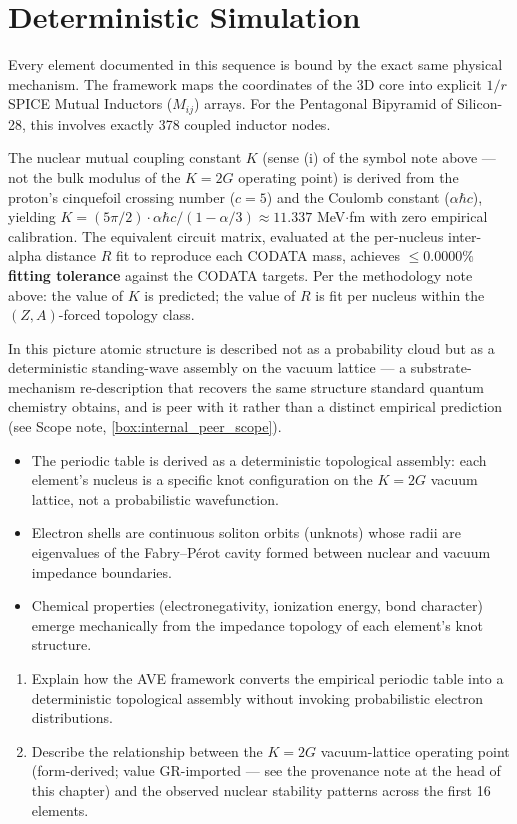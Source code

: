 \section{Deterministic Simulation}
Every element documented in this sequence is bound by the exact same physical mechanism. The framework maps the coordinates of the 3D core into explicit $1/r$ SPICE Mutual Inductors ($M_{ij}$) arrays. For the Pentagonal Bipyramid of Silicon-28, this involves exactly 378 coupled inductor nodes.

The nuclear mutual coupling constant $K$ (sense (i) of the symbol note above --- not the bulk modulus of the $K=2G$ operating point) is derived from the proton's cinquefoil crossing number ($c=5$) and the Coulomb constant ($\alpha\hbar c$), yielding $K = (5\pi/2)\cdot\alpha\hbar c / (1 - \alpha/3) \approx 11.337$ MeV$\cdot$fm with zero empirical calibration. The equivalent circuit matrix, evaluated at the per-nucleus inter-alpha distance $R$ fit to reproduce each CODATA mass, achieves \textbf{$\leq 0.0000\%$ fitting tolerance} against the CODATA targets. Per the methodology note above: the value of $K$ is predicted; the value of $R$ is fit per nucleus within the $(Z,A)$-forced topology class.

In this picture atomic structure is described not as a probability cloud but as a deterministic standing-wave assembly on the vacuum lattice --- a substrate-mechanism re-description that recovers the same structure standard quantum chemistry obtains, and is peer with it rather than a distinct empirical prediction (see Scope note, \ref{box:internal_peer_scope}).

\begin{summarybox}
\begin{itemize}
    \item The periodic table is derived as a deterministic topological assembly: each element's nucleus is a specific knot configuration on the $K=2G$ vacuum lattice, not a probabilistic wavefunction.
    \item Electron shells are continuous soliton orbits (unknots) whose radii are eigenvalues of the Fabry--P\'{e}rot cavity formed between nuclear and vacuum impedance boundaries.
    \item Chemical properties (electronegativity, ionization energy, bond character) emerge mechanically from the impedance topology of each element's knot structure.
\end{itemize}
\end{summarybox}

\begin{exercisebox}
\begin{enumerate}
    \item Explain how the AVE framework converts the empirical periodic table into a deterministic topological assembly without invoking probabilistic electron distributions.
    \item Describe the relationship between the $K=2G$ vacuum-lattice operating point (form-derived; value GR-imported --- see the provenance note at the head of this chapter) and the observed nuclear stability patterns across the first 16 elements.
\end{enumerate}
\end{exercisebox}

